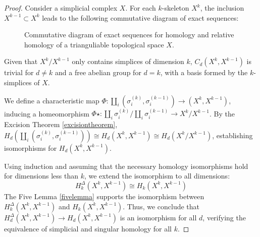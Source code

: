 \begin{proof}
	Consider a simplicial complex $X$. For each $k$-skeleton $X^{k}$, the inclusion
	$X^{k-1}\subset X^{k}$ leads to the following commutative diagram of exact sequences:
	\begin{figure}[h]
		\centering
		\caption{Commutative diagram of exact sequences for homology and relative
		homology of a trianguliable topological space $X$.}
	\end{figure}

	Given that $X^{k}/X^{k-1}$ only contains simplices of dimension $k$,
	$C_{d}(X^{k}, X^{k-1})$ is trivial for $d \neq k$ and a free abelian group for
	$d = k$, with a basis formed by the $k$-simplices of $X$.

	We define a characteristic map $\Phi: \coprod_{i}(\sigma^{(k)}_{i}, \sigma^{(k-1)}
	_{i}) \rightarrow (X^{k}, X^{k-1})$, inducing a homeomorphism
	$\Phi\star: \coprod_{i} \sigma^{(k)}_{i}/\coprod_{i} \sigma^{(k-1)}_{i} \rightarrow
	X^{k}/X^{k-1}$. By the Excision Theorem \ref{excisiontheorem},
	$H_{d}(\coprod_{i} (\sigma^{(k)}_{i}, \sigma^{(k-1)}_{i})) \cong H_{d}(X^{k}, X
	^{k-1}) \cong H_{d}(X^{k}/X^{k-1})$, establishing isomorphisms for $H_{d}(X^{k}
	, X^{k-1})$.

	Using induction and assuming that the necessary homology isomorphisms hold for
	dimensions less than $k$, we extend the isomorphism to all dimensions:
	\begin{equation}
		H_{k}^{\Delta}(X^{k},X^{k-1}) \cong H_{k}(X^{k},X^{k-1})
	\end{equation}
	The Five Lemma \ref{fivelemma} supports the isomorphism between $H_{k}^{\Delta}
	(X^{k}, X^{k-1})$ and $H_{k}(X^{k}, X^{k-1})$. Thus, we conclude that $H_{d}^{\Delta}
	(X^{k}, X^{k-1}) \rightarrow H_{d}(X^{k}, X^{k-1})$ is an isomorphism for all $d$,
	verifying the equivalence of simplicial and singular homology for all $k$.
\end{proof}
